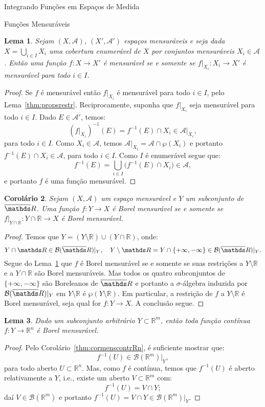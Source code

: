 \documentclass[oneside,final,11pt]{amsbook}
\newcommand{\R}{\mathds R}
\newcommand{\Borel}{\mathcal B}
\theoremstyle{remark}\newtheorem{exercise}{Exercício}[chapter]
\theoremstyle{remark}\newtheorem{*exercise}[exercise]{\hbox to 0pt{\hskip 0pt minus 1fil*}Exercício}
\theoremstyle{definition}\newtheorem{exdefin}{Definição}[chapter]
\theoremstyle{plain}\newtheorem{teo}{Teorema}[section]
\theoremstyle{plain}\newtheorem{lem}[teo]{Lema}
\theoremstyle{plain}\newtheorem{prop}[teo]{Proposição}
\theoremstyle{plain}\newtheorem{cor}[teo]{Corolário}
\theoremstyle{definition}\newtheorem{defin}[teo]{Definição}
\theoremstyle{remark}\newtheorem{rem}[teo]{Observação}
\theoremstyle{definition}\newtheorem{notation}[teo]{Notação}
\theoremstyle{definition}\newtheorem{convention}[teo]{Convenção}
\theoremstyle{definition}\newtheorem{example}[teo]{Exemplo}
\numberwithin{section}{chapter}
\numberwithin{equation}{section}
\begin{document}
\begin{chapter}{Integrando Funções em Espaços de Medida}
\begin{section}{Funções Mensuráveis}
\begin{lem}\label{thm:cobremensf}
Sejam $(X,\mathcal A)$, $(X',\mathcal A')$ espaços mensuráveis e seja dada
$X=\bigcup_{i\in I}X_i$ uma cobertura enumerável de $X$ por conjuntos mensuráveis $X_i\in\mathcal A$.
Então uma função $f:X\to X'$ é mensurável se e somente se
$f\vert_{X_i}:X_i\to X'$ é mensurável para todo $i\in I$.
\end{lem}
\begin{proof}
Se $f$ é mensurável então $f\vert_{X_i}$ é mensurável para todo $i\in I$, pelo Lema~\ref{thm:propsrestr}.
Reciprocamente, suponha que $f\vert_{X_i}$ seja mensurável para todo $i\in I$. Dado $E\in\mathcal A'$,
temos:
\[(f\vert_{X_i})^{-1}(E)=f^{-1}(E)\cap X_i\in\mathcal A\vert_{X_i},\]
para todo $i\in I$.
Como $X_i\in\mathcal A$, temos $\mathcal A\vert_{X_i}=\mathcal A\cap\wp(X_i)$ e portanto
$f^{-1}(E)\cap X_i\in\mathcal A$, para todo $i\in I$. Como $I$ é enumerável segue que:
\[f^{-1}(E)=\bigcup_{i\in I}\big(f^{-1}(E)\cap X_i\big)\in\mathcal A,\]
e portanto $f$ é uma função mensurável.
\end{proof}

\begin{cor}\label{thm:BorelrestrR}
Sejam $(X,\mathcal A)$ um espaço mensurável e $Y$ um subconjunto de $\overline\R$. Uma função
$f:Y\to X$ é Borel mensurável se e somente se $f\vert_{Y\cap\R}:Y\cap\R\to X$ é Borel mensurável.
\end{cor}
\begin{proof}
Temos que $Y=(Y\setminus\R)\cup(Y\cap\R)$, onde:
\[Y\cap\R\in\Borel(\overline\R)\vert_Y,\quad
Y\setminus\R=Y\cap\{+\infty,-\infty\}\in\Borel(\overline\R)\vert_Y.\]
Segue do Lema~\ref{thm:cobremensf} que $f$ é Borel mensurável se e somente se
suas restrições a $Y\setminus\R$ e a $Y\cap\R$ são Borel mensuráveis.
Mas todos os quatro subconjuntos de $\{+\infty,-\infty\}$ são Boreleanos de $\overline\R$ e portanto
a $\sigma$-álgebra induzida por $\Borel(\overline\R)\vert_Y$ em $Y\setminus\R$
é $\wp(Y\setminus\R)$. Em particular, a restrição de $f$ a $Y\setminus\R$ é Borel mensurável,
seja qual for $f:Y\to X$. A conclusão segue.
\end{proof}

\begin{lem}\label{thm:contmens}
Dado um subconjunto arbitrário $Y\subset\R^m$, então toda função contínua
$f:Y\to\R^n$ é Borel mensurável.
\end{lem}
\begin{proof}
Pelo Corolário~\ref{thm:cormenscontrRn}, é suficiente mostrar que:
\[f^{-1}(U)\in\Borel(\R^m)\vert_Y,\]
para todo aberto $U\subset\R^n$.
Mas, como $f$ é contínua, temos que $f^{-1}(U)$ é aberto relativamente a $Y$, i.e., existe
um aberto $V\subset\R^m$ com:
\[f^{-1}(U)=V\cap Y;\]
daí $V\in\Borel(\R^m)$ e portanto $f^{-1}(U)=V\cap Y\in\Borel(\R^m)\vert_Y$.
\end{proof}


\end{section}
\end{chapter}
\end{document}
